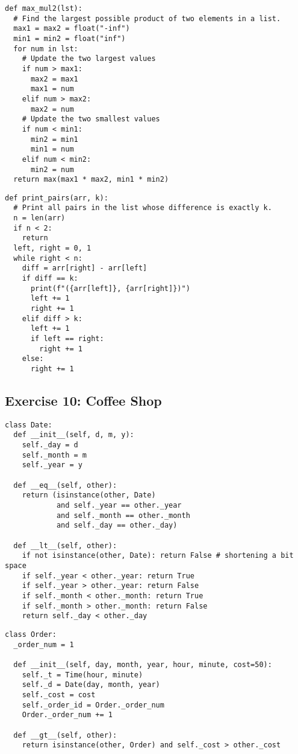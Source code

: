 \documentclass[11pt]{article}
\begin{document}
\begin{multicols}{2}
\begin{lstlisting}
def max_mul2(lst):
  # Find the largest possible product of two elements in a list.
  max1 = max2 = float("-inf")
  min1 = min2 = float("inf")
  for num in lst:
    # Update the two largest values
    if num > max1:
      max2 = max1
      max1 = num
    elif num > max2:
      max2 = num
    # Update the two smallest values
    if num < min1:
      min2 = min1
      min1 = num
    elif num < min2:
      min2 = num
  return max(max1 * max2, min1 * min2)
\end{lstlisting}
\begin{lstlisting}
def print_pairs(arr, k):
  # Print all pairs in the list whose difference is exactly k.
  n = len(arr)
  if n < 2:
    return
  left, right = 0, 1
  while right < n:
    diff = arr[right] - arr[left]
    if diff == k:
      print(f"({arr[left]}, {arr[right]})")
      left += 1
      right += 1
    elif diff > k:
      left += 1
      if left == right:
        right += 1
    else:
      right += 1
\end{lstlisting}
\end{multicols}

\subsection{Exercise 10: Coffee Shop}\label{subsec:exercise-10}
\begin{lstlisting}
class Date:
  def __init__(self, d, m, y):
    self._day = d
    self._month = m
    self._year = y

  def __eq__(self, other):
    return (isinstance(other, Date)
            and self._year == other._year
            and self._month == other._month
            and self._day == other._day)

  def __lt__(self, other):
    if not isinstance(other, Date): return False # shortening a bit space
    if self._year < other._year: return True
    if self._year > other._year: return False
    if self._month < other._month: return True
    if self._month > other._month: return False
    return self._day < other._day
\end{lstlisting}

\pagebreak

\begin{lstlisting}
class Order:
  _order_num = 1

  def __init__(self, day, month, year, hour, minute, cost=50):
    self._t = Time(hour, minute)
    self._d = Date(day, month, year)
    self._cost = cost
    self._order_id = Order._order_num
    Order._order_num += 1

  def __gt__(self, other):
    return isinstance(other, Order) and self._cost > other._cost
\end{lstlisting}
\end{document}
